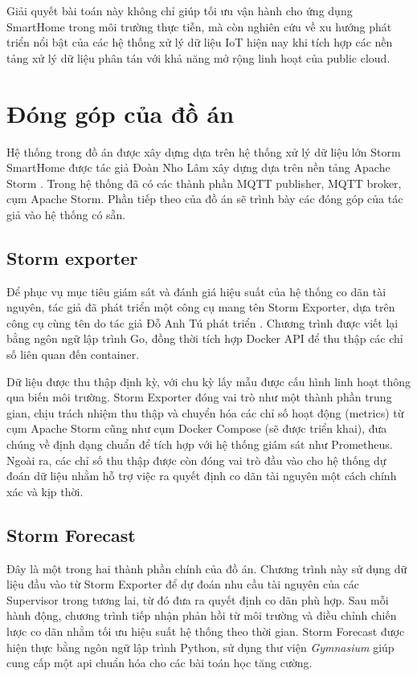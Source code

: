 Giải quyết bài toán này không chỉ giúp tối ưu vận hành cho ứng dụng SmartHome trong môi trường thực tiễn, mà còn nghiên cứu về xu hướng phát triển nổi bật của các hệ thống xử lý dữ liệu IoT hiện nay khi tích hợp các nền tảng xử lý dữ liệu phân tán với khả năng mở rộng linh hoạt của public cloud.

\section{Đóng góp của đồ án}

Hệ thống trong đồ án được xây dựng dựa trên hệ thống xử lý dữ liệu lớn Storm SmartHome được tác giả Đoàn Nho Lâm xây dựng dựa trên nền tảng Apache Storm \autocite{fimocodestormsmarthome}. Trong hệ thống đã có các thành phần MQTT publisher, MQTT broker, cụm Apache Storm. Phần tiếp theo của đồ án sẽ trình bày các đóng góp của tác giả vào hệ thống có sẵn.

\subsection{Storm exporter}

Để phục vụ mục tiêu giám sát và đánh giá hiệu suất của hệ thống co dãn tài nguyên, tác giả đã phát triển một công cụ mang tên Storm Exporter, dựa trên công cụ cùng tên do tác giả Đỗ Anh Tú phát triển \autocite{mr4x2stormexporterprometheus}. Chương trình được viết lại bằng ngôn ngữ lập trình Go, đồng thời tích hợp Docker API để thu thập các chỉ số liên quan đến container.

Dữ liệu được thu thập định kỳ, với chu kỳ lấy mẫu được cấu hình linh hoạt thông qua biến môi trường. Storm Exporter đóng vai trò như một thành phần trung gian, chịu trách nhiệm thu thập và chuyển hóa các chỉ số hoạt động (metrics) từ cụm Apache Storm cũng như cụm Docker Compose (sẽ được triển khai), đưa chúng về định dạng chuẩn để tích hợp với hệ thống giám sát như Prometheus. Ngoài ra, các chỉ số thu thập được còn đóng vai trò đầu vào cho hệ thống dự đoán dữ liệu nhằm hỗ trợ việc ra quyết định co dãn tài nguyên một cách chính xác và kịp thời.

\subsection{Storm Forecast}

Đây là một trong hai thành phần chính của đồ án. Chương trình này sử dụng dữ liệu đầu vào từ Storm Exporter để dự đoán nhu cầu tài nguyên của các Supervisor trong tương lai, từ đó đưa ra quyết định co dãn phù hợp. Sau mỗi hành động, chương trình tiếp nhận phản hồi từ môi trường và điều chỉnh chiến lược co dãn nhằm tối ưu hiệu suất hệ thống theo thời gian. Storm Forecast được hiện thực bằng ngôn ngữ lập trình Python, sử dụng thư viện \textit{Gymnasium} \autocite{gymnasium} giúp cung cấp một \acrshort{api} chuẩn hóa cho các bài toán học tăng cường.

